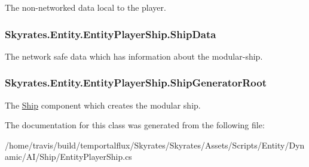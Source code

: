 The non-\/networked data local to the player. 

\hypertarget{class_skyrates_1_1_entity_1_1_entity_player_ship_af6c72c799869168d507cec7914ed0ccc}{
\subsubsection[{Ship\-Data}]{ Skyrates.\-Entity.\-Entity\-Player\-Ship.\-Ship\-Data}}\label{class_skyrates_1_1_entity_1_1_entity_player_ship_af6c72c799869168d507cec7914ed0ccc}


The network safe data which has information about the modular-\/ship. 

\hypertarget{class_skyrates_1_1_entity_1_1_entity_player_ship_abec0fc0c6cc3462c7019ac48b74879ca}{
\subsubsection[{Ship\-Generator\-Root}]{ Skyrates.\-Entity.\-Entity\-Player\-Ship.\-Ship\-Generator\-Root}}\label{class_skyrates_1_1_entity_1_1_entity_player_ship_abec0fc0c6cc3462c7019ac48b74879ca}


The \hyperlink{namespace_skyrates_1_1_ship}{Ship} component which creates the modular ship. 



The documentation for this class was generated from the following file\-:\begin{DoxyCompactItemize}
\item 
/home/travis/build/temportalflux/\-Skyrates/\-Skyrates/\-Assets/\-Scripts/\-Entity/\-Dynamic/\-A\-I/\-Ship/Entity\-Player\-Ship.\-cs\end{DoxyCompactItemize}
